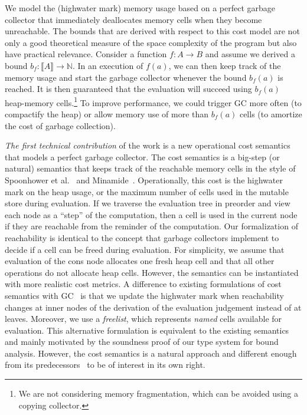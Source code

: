 \documentclass{easychair}
\newcommand{\denote}[1]{\llbracket#1\rrbracket}
\theoremstyle{definition}
\begin{document}
We model the (highwater mark) memory
usage based on a perfect garbage collector that immediately
deallocates memory cells when they become unreachable. The bounds that
are derived with respect to this cost model are not only a good theoretical
measure of the space complexity of the program but also have practical
relevance. Consider a function $f : A \to B$ and assume we derived a
bound $b_f : \denote{A} \to \mathbb{N}$. In an execution of $f(a)$, we
can then keep track of the memory usage and start the garbage
collector whenever the bound $b_f(a)$ is reached. It is then
guaranteed that the evaluation will succeed using $b_f(a)$ heap-memory
cells.\footnote{We are not considering memory fragmentation, which
  can be avoided using a copying collector.} To improve performance,
we could trigger GC more often (to compactify the heap) 
or allow memory use of more than $b_f(a)$ cells 
(to amortize the cost of garbage collection).

\emph{The first technical contribution} of the work is a new
operational cost semantics that models a perfect garbage collector.
%
The cost semantics is a big-step (or natural) semantics that keeps
track of the reachable memory cells in the style of Spoonhower et
al.~\cite{Spoonhower:2008:SPP:1411204.1411240} and
Minamide~\cite{DBLP:journals/entcs/Minamide99}. Operationally, this
cost is the highwater mark on the heap usage, or the maximum number of
cells used in the mutable store during evaluation. If we traverse the 
evaluation tree in preorder and view each node as a ``step'' 
of the computation, then a cell is used in the current node
if they are reachable from the reminder of the
computation. Our formalization of reachability is identical to the
concept that garbage collectors implement to decide if a cell can be
freed during evaluation. For simplicity, we assume that evaluation of
the cons node allocates one fresh heap cell and that all other
operations do not allocate heap cells. However, the semantics can be
instantiated with more realistic cost metrics. A difference to
existing formulations of cost semantics with
GC~\cite{Spoonhower:2008:SPP:1411204.1411240,DBLP:journals/entcs/Minamide99}
is that we update the highwater mark when reachability changes at
inner nodes of the derivation of the evaluation judgement instead of at
leaves. Moreover, we use a \emph{freelist}, which represents \emph{named}
cells available for evaluation. This alternative formulation is
equivalent to the existing semantics and mainly motivated by the
soundness proof of our type system for bound analysis.  However, the
cost semantics is a natural approach and different enough from its
predecessors~\cite{Spoonhower:2008:SPP:1411204.1411240,DBLP:journals/entcs/Minamide99}
to be of interest in its own right.
\end{document}
